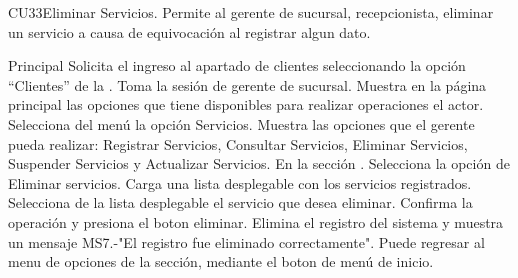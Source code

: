 



	\begin{UseCase}{CU33}{Eliminar Servicios.}{
		Permite al gerente de sucursal, recepcionista, eliminar un servicio a causa de equivocación al registrar algun dato.
	}
	\end{UseCase}

	\begin{UCtrayectoria}{Principal}
		\UCpaso[\UCactor] Solicita el ingreso al apartado de clientes seleccionando la opción ``Clientes'' de la .
		\UCpaso Toma la sesión de gerente de sucursal.
		\UCpaso Muestra en la página principal las opciones que tiene disponibles para realizar operaciones el actor.
		\UCpaso[\UCactor] Selecciona del menú la opción Servicios.
		\UCpaso Muestra las opciones que el gerente pueda realizar: Registrar Servicios, Consultar Servicios, Eliminar Servicios, Suspender Servicios y Actualizar Servicios. En la sección .
		\UCpaso[\UCactor] Selecciona la opción de Eliminar servicios.
		\UCpaso Carga una lista desplegable con los servicios registrados. 
		\UCpaso[\UCactor] Selecciona de la lista desplegable el servicio que desea eliminar.
		\UCpaso[\UCactor] Confirma la operación y presiona el boton eliminar.
		\UCpaso Elimina el registro del sistema y muestra un mensaje MS7.-"El registro fue eliminado correctamente".
		\UCpaso[\UCactor] Puede regresar al menu de opciones de la sección, mediante el boton de menú de inicio.
	\end{UCtrayectoria}

